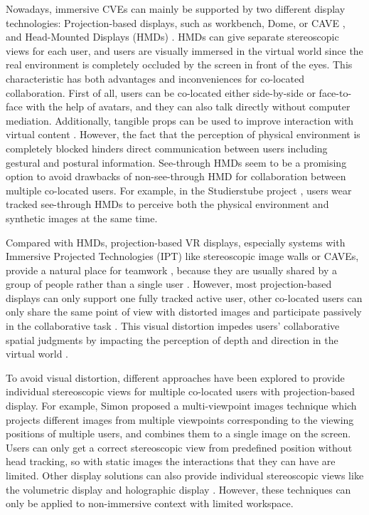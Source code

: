 Nowadays, immersive CVEs can mainly be supported by two different display technologies: Projection-based displays, such as workbench, Dome, or CAVE \citep{CruzNeira1993SPV}, and Head-Mounted Displays (HMDs) \citep{Melzer1997HMD}. HMDs can give separate stereoscopic views for each user, and users are visually immersed in the virtual world since the real environment is completely occluded by the screen in front of the eyes. This characteristic has both advantages and inconveniences for co-located collaboration. First of all, users can be co-located either side-by-side or face-to-face with the help of avatars, and they can also talk directly without computer mediation. Additionally, tangible props can be used to improve interaction with virtual content \citep{Salzmann2008TUS}. However, the fact that the perception of physical environment is completely blocked hinders direct communication between users including gestural and postural information. See-through HMDs seem to be a promising option to avoid drawbacks of non-see-through HMD for collaboration between multiple co-located users. For example, in the Studierstube project \citep{Schmalstieg2002Studierstube}, users wear tracked see-through HMDs to perceive both the physical environment and synthetic images at the same time.

Compared with HMDs, projection-based VR displays, especially systems with Immersive Projected Technologies (IPT) like stereoscopic image walls or CAVEs, provide a natural place for teamwork \citep{Johanson2002IWP}, because they are usually shared by a group of people rather than a single user \citep{Benford1996SST}. However, most projection-based displays can only support one fully tracked active user, other co-located users can only share the same point of view with distorted images and participate passively in the collaborative task \citep{Bayon2006Multiple}. This visual distortion impedes users’ collaborative spatial judgments by impacting the perception of depth and direction in the virtual world \citep{Pollock2012Right}.

To avoid visual distortion, different approaches have been explored to provide individual stereoscopic views for multiple co-located users with projection-based display. For example, Simon proposed a multi-viewpoint images technique \citep{Simon2007MVI} which projects different images from multiple viewpoints corresponding to the viewing positions of multiple users, and combines them to a single image on the screen. Users can only get a correct stereoscopic view from predefined position without head tracking, so with static images the interactions that they can have are limited. Other display solutions can also provide individual stereoscopic views like the volumetric display \citep{Grossman2008Volum} and holographic display \citep{Lucente1997Holo}. However, these techniques can only be applied to non-immersive context with limited workspace.

